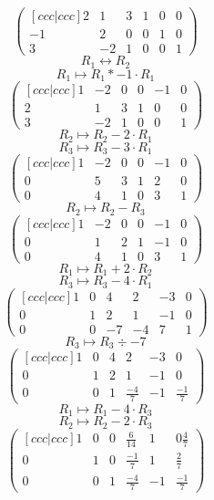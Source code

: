\documentclass[lineaire_algebra_oplossingen.tex]{subfiles}
\begin{document}
\[
\begin{pmatrix}[ccc|ccc]
2 & 1 & 3 & 1 & 0 & 0\\
-1 & 2 & 0 & 0 & 1 & 0\\
3 & -2 & 1 & 0 & 0 & 1
\end{pmatrix}
\]   
\[ R_1 \leftrightarrow R_2 \]
\[ R_1 \longmapsto R_1 * -1\cdot R_1\]
\[
\begin{pmatrix}[ccc|ccc]
1 & -2 & 0 & 0 & -1 & 0\\
2 & 1 & 3 & 1 & 0 & 0\\
3 & -2 & 1 & 0 & 0 & 1
\end{pmatrix}
\]
\[ R_2 \longmapsto R_2 - 2\cdot R_1 \]
\[ R_3 \longmapsto R_3 - 3\cdot R_1 \]
\[
\begin{pmatrix}[ccc|ccc]
1 & -2 & 0 & 0 & -1 & 0\\
0 & 5 & 3 & 1 & 2 & 0\\
0 & 4 & 1 & 0 & 3 & 1
\end{pmatrix}
\]
\[ R_2 \longmapsto R_2 - R_3 \]
\[
\begin{pmatrix}[ccc|ccc]
1 & -2 & 0 & 0 & -1 & 0\\
0 & 1 & 2 & 1 & -1 & 0\\
0 & 4 & 1 & 0 & 3 & 1
\end{pmatrix}
\]
\[ R_1 \longmapsto R_1 + 2\cdot R_2 \]
\[ R_3 \longmapsto R_3 - 4\cdot R_1 \]
\[
\begin{pmatrix}[ccc|ccc]
1 & 0 & 4 & 2 & -3 & 0\\
0 & 1 & 2 & 1 & -1 & 0\\
0 & 0 & -7 & -4 & 7 & 1
\end{pmatrix}
\]
\[ R_3 \longmapsto R_3 \div -7  \]
\[
\begin{pmatrix}[ccc|ccc]
1 & 0 & 4 & 2 & -3 & 0\\
0 & 1 & 2 & 1 & -1 & 0\\
0 & 0 & 1 & \frac{-4}{7} & -1 & \frac{-1}{7}
\end{pmatrix}
\]
\[ R_1 \longmapsto R_1  - 4 \cdot R_3 \]
\[ R_2 \longmapsto R_2 - 2 \cdot R_3 \]
\[
\begin{pmatrix}[ccc|ccc]
1 & 0 & 0 & \frac{6}{14} & 1 & 0\frac{4}{7}\\
0 & 1 & 0 & \frac{-1}{7} & 1 & \frac{2}{7}\\
0 & 0 & 1 & \frac{-4}{7} & -1 & \frac{-1}{7}
\end{pmatrix}
\]
\end{document}
